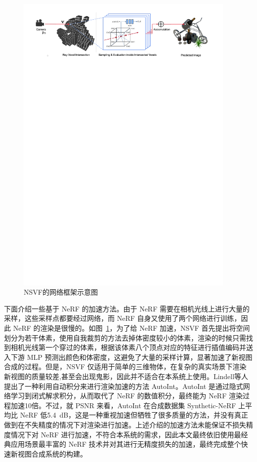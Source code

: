 \begin{figure}[htb]
	\centering
	\includegraphics[width=0.95\textwidth]{figures/NSVF.pdf}
	\caption{NSVF\cite{liu2020neural}的网络框架示意图}
	\label{fig:nsvf}
\end{figure}

下面介绍一些基于 NeRF 的加速方法。由于 NeRF 需要在相机光线上进行大量的采样，这些采样点都要经过网络，而 NeRF 自身又使用了两个网络进行训练，因此 NeRF 的渲染是很慢的。如图~\ref{fig:nsvf}，为了给 NeRF 加速，NSVF\cite{liu2020neural} 首先提出将空间划分为若干体素，使用自我裁剪的方法去掉体密度较小的体素，渲染的时候只需找到相机光线第一个穿过的体素，根据该体素八个顶点对应的特征进行插值编码并送入下游 MLP 预测出颜色和体密度，这避免了大量的采样计算，显著加速了新视图合成的过程。但是，NSVF 仅适用于简单的三维物体，在复杂的真实场景下渲染新视图的质量较差,甚至会出现鬼影，因此并不适合在本系统上使用。Lindell等人\cite{lindell2020autoint}提出了一种利用自动积分来进行渲染加速的方法 AutoInt。AutoInt 是通过隐式网络学习到闭式解求积分，从而取代了 NeRF 的数值积分，最终能为 NeRF 渲染过程加速10倍。不过，就 PSNR 来看，AutoInt 在合成数据集 Synthetic-NeRF 上平均比 NeRF 低\SI{5.4}{dB}，这是一种重视加速但牺牲了很多质量的方法，并没有真正做到在不失精度的情况下对渲染进行加速。上述介绍的加速方法未能保证不损失精度情况下对 NeRF 进行加速，不符合本系统的需求，因此本文最终依旧使用最经典应用场景最丰富的 NeRF 技术并对其进行无精度损失的加速，最终完成整个快速新视图合成系统的构建。

